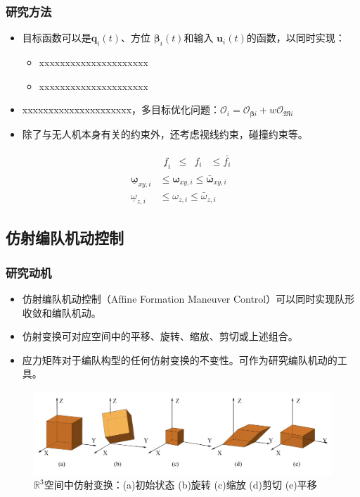 \documentclass{beamer}
\theoremstyle{remark}
\begin{document}
\begin{frame}
	\frametitle{研究方法}
	\begin{itemize}
		\item  目标函数可以是$\bm{q}_i(t)$、方位 $	\bm{\beta}_i(t) $和输入 $\bm{u}_i(t) $的函数，以同时实现：
		\begin{itemize}
			\item xxxxxxxxxxxxxxxxxxxxx
			\item xxxxxxxxxxxxxxxxxxxxx
		\end{itemize}
		\item xxxxxxxxxxxxxxxxxxxxx，多目标优化问题：$\mathcal{O}_{i}=\mathcal{O}_{\boldsymbol{\beta}i}+w\mathcal{O}_{\mathfrak{M}i}$
		\item 除了与无人机本身有关的约束外，还考虑视线约束，碰撞约束等。
	\end{itemize}
	\begin{equation}
		\begin{aligned}
			&\begin{aligned}\underline{f}_i&\leq&f_i&\leq\bar{f_i}\end{aligned} \\
			\underline{\boldsymbol{\omega}}_{xy,i}& \leq\boldsymbol{\omega}_{xy,i}\leq\bar{\boldsymbol{\omega}}_{xy,i}  \\
			\underline{\omega}_{z,i}& \leq\left.\omega_{z,i}\right.\leq\bar{\omega}_{z,i} 
		\end{aligned}
	\end{equation}
\end{frame}

\subsection{仿射编队机动控制}
\begin{frame}
	\frametitle{研究动机}
	\begin{itemize}
		\item  仿射编队机动控制（Afﬁne Formation Maneuver Control）可以同时实现队形收敛和编队机动。
		\item 仿射变换可对应空间中的平移、旋转、缩放、剪切或上述组合。
		\item 应力矩阵对于编队构型的任何仿射变换的不变性。可作为研究编队机动的工具。
	\end{itemize}
	\begin{figure}[H]
		\centering
		\includegraphics[width=1\linewidth]{Fig/affine.png}
		\caption{$\mathbb{R}^3$空间中仿射变换：(a)初始状态 (b)旋转 (c)缩放 (d)剪切 (e)平移}
	\end{figure}
\end{frame}
\end{document}

